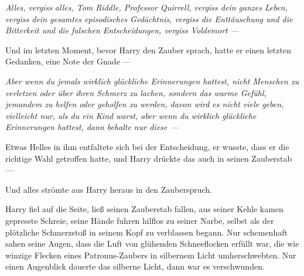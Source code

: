 \emph{Alles, vergiss alles, Tom Riddle, Professor Quirrell, vergiss dein ganzes Leben, vergiss dein gesamtes episodisches Gedächtnis, vergiss die Enttäuschung und die Bitterkeit und die falschen Entscheidungen, vergiss Voldemort —}

Und im letzten Moment, bevor Harry den Zauber sprach, hatte er einen letzten Gedanken, eine Note der Gnade —

\emph{Aber wenn du jemals wirklich glückliche Erinnerungen hattest, nicht Menschen zu verletzen oder über ihren Schmerz zu lachen, sondern das warme Gefühl, jemandem zu helfen oder geholfen zu werden, davon wird es nicht viele geben, vielleicht nur, als du ein Kind warst, aber wenn du wirklich glückliche Erinnerungen hattest, dann behalte nur diese —}

Etwas Helles in ihm entfaltete sich bei der Entscheidung, er wusste, dass er die richtige Wahl getroffen hatte, und Harry drückte das auch in seinen Zauberstab —


Und alles strömte aus Harry heraus in den Zauberspruch.

Harry fiel auf die Seite, ließ seinen Zauberstab fallen, aus seiner Kehle kamen gepresste Schreie, seine Hände fuhren hilflos zu seiner Narbe, selbst als der plötzliche Schmerzstoß in seinem Kopf zu verblassen begann. Nur schemenhaft sahen seine Augen, dass die Luft von glühenden Schneeflocken erfüllt war, die wie winzige Flecken eines Patronus-Zaubers in silbernem Licht umherschwebten.
Nur einen Augenblick dauerte das silberne Licht, dann war es verschwunden.

